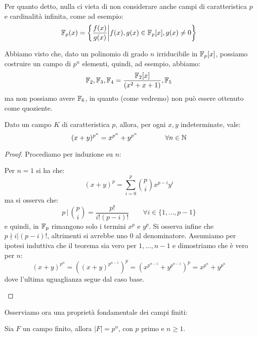 \documentclass[11pt]{scrartcl}
\begin{document}
\begin{example}
Per quanto detto, nulla ci vieta di non considerare anche campi di caratteristica $p$ e
cardinalità infinita, come ad esempio:
	\[ {\mathbb F}_p(x) = \left\{\frac{f(x)}{g(x)} \middle| f(x),g(x) \in {\mathbb F}_p[x], g(x) \ne 0\right\}
		\]

\end{example}

\begin{remark}
	Abbiamo visto che, dato un polinomio di grado $n$ irriducibile in ${\mathbb F}_p[x]$, possiamo costruire un campo di $p^n$
	elementi, quindi, ad esempio, abbiamo:
		\[\mathbb{F}_{2},\mathbb{F}_{3},\mathbb{F}_{4}=\frac{\mathbb{F}_{2}[x]}{(x^2+x+1)},\mathbb{F}_{5}
			\]
		ma non possiamo avere $\mathbb{F}_{6}$, in quanto (come vedremo) non può essere ottenuto come quoziente.
\end{remark}

\newpage
\begin{lemma}
\label{cf:bin}
Dato un campo $K$ di caratteristica $p$, allora, per ogni $x,y$ indeterminate,
vale:
	\[ (x+y)^{p^n} = x^{p^n} + y^{p^n}
	\qquad
	\qquad \forall n \in \mathbb N
		\]
\end{lemma}

\begin{proof}
	Procediamo per induzione su $n$:
		\begin{itemize}
			\ii Per $n = 1$ si ha che:
				\[ (x+y)^p = \sum_{i=0}^{p}\binom{p}{i}x^{p-i}y^i
					\]
			ma si osserva che:
				\[ p \, \Big| \, \binom{p}{i} = \frac{p!}{i!(p-i)!}
				\qquad \forall i \in \{1,\ldots,p-1\}
					\]
				e quindi, in ${\mathbb F}_p$ rimangono solo i termini $x^p$ e $y^p$. Si osserva infine che $p \nmid i|(p-i)!$, altrimenti si 
				avrebbe uno $0$ al denominatore.
			\ii Assumiamo per ipotesi induttiva che il teorema sia vero per
			$1,\ldots,n-1$ e dimostriamo che è vero per $n$:
				\[ (x+y)^{p^n} = \left((x+y)^{p^{n-1}}\right)^{p} = \left(x^{p^{n-1}} + y^{p^{n-1}}\right)^p = x^{p^n} + y^{p^n}
					\]
			dove l'ultima uguaglianza segue dal caso base.
		\end{itemize} 
\end{proof}

Osserviamo ora una proprietà fondamentale dei campi finiti:

\begin{proposition}
	Sia $F$ un campo finito, allora $|F| = p^n$, con $p$ primo e $n \geq 1$.
\end{proposition}
\end{document}
